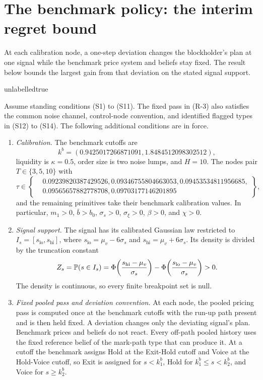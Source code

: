 
\section{The benchmark policy: the interim regret bound}
\label{sec:regret}

At each calibration node, a one-step deviation changes the blockholder's plan at one signal while
the benchmark price system and beliefs stay fixed. The result below bounds the largest gain from
that deviation on the stated signal support.

\csname unlabelledtrue\endcsname
\begin{proposition}
\label{prop:regret}
Assume standing conditions (S1) to (S11). The fixed pass in (R-3) also satisfies the common noise
channel, control-node convention, and identified flagged types in (S12) to (S14). The following
additional conditions are in force.
\begin{enumerate}[label=(R-\arabic*),leftmargin=3.2em,itemsep=3pt]
\item \emph{Calibration.} The benchmark cutoffs are
  \[
  k^b=(0.9425017266871091, 1.8484512098302512),
  \]
  liquidity is $\kappa=0.5$, order size is two noise lumps, and $H=10$. The nodes pair
  $T\in\{3,5,10\}$ with
  \[
  \tau\in\left\{
  \begin{aligned}
  &0.09239820387429526, 0.09346755804663053, 0.09453534811956685,\\
  &0.09565657882778708, 0.09703177146201895
  \end{aligned}
  \right\},
  \]
  and the remaining primitives take their benchmark calibration values. In particular,
  $m_1>0$, $\bar b>b_0$, $\sigma_s>0$, $\sigma_\xi>0$, $\beta>0$, and $\chi>0$.
\item \emph{Signal support.} The signal has its calibrated Gaussian law restricted to
  $I_s=[s_{\mathrm{lo}},s_{\mathrm{hi}}]$, where
  $s_{\mathrm{lo}}=\mu_v-6\sigma_s$ and $s_{\mathrm{hi}}=\mu_v+6\sigma_s$. Its density is divided by the
  truncation constant
  \[
  Z_s=\mathbb{P}(s\in I_s)
  =\Phi\!\left(\frac{s_{\mathrm{hi}}-\mu_v}{\sigma_s}\right)
  -\Phi\!\left(\frac{s_{\mathrm{lo}}-\mu_v}{\sigma_s}\right)>0.
  \]
  The density is continuous, so every finite breakpoint set is null.
\item \emph{Fixed pooled pass and deviation convention.} At each node, the pooled pricing pass is
  computed once at the benchmark cutoffs with the run-up path present and is then held fixed. A
  deviation changes only the deviating signal's plan. Benchmark prices and beliefs do not react.
  Every off-path pooled history uses the fixed reference belief of the mark-path type that can
  produce it. At a cutoff the benchmark assigns Hold at the Exit-Hold cutoff and Voice at the
  Hold-Voice cutoff, so Exit is assigned for $s<k_1^b$, Hold for
  $k_1^b\le s<k_2^b$, and Voice for $s\ge k_2^b$.
\end{enumerate}


\end{proposition}
